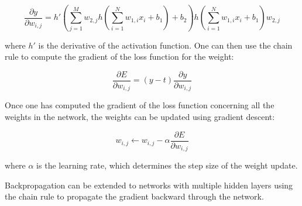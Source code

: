 \begin{equation}
	\frac{\partial y}{\partial w_{i,j}} = h'(\sum_{j=1}^M w_{2,j} h(\sum_{i=1}^N w_{1,i} x_i + b_1) + b_2) h(\sum_{i=1}^N w_{1,i} x_i + b_1) w_{2,j}
\end{equation}

where $h'$ is the derivative of the activation function. One can then use the chain rule to compute the gradient of the loss function for the weight:

\begin{equation}
	\frac{\partial E}{\partial w_{i,j}} = (y - t)\frac{\partial y}{\partial w_{i,j}}
\end{equation}

Once one has computed the gradient of the loss function concerning all the weights in the network, the weights can be updated using gradient descent:

\begin{equation}
	w_{i,j} \leftarrow w_{i,j} - \alpha \frac{\partial E}{\partial w_{i,j}}
\end{equation}

where $\alpha$ is the learning rate, which determines the step size of the weight update.

Backpropagation can be extended to networks with multiple hidden layers using the chain rule to propagate the gradient backward through the network.